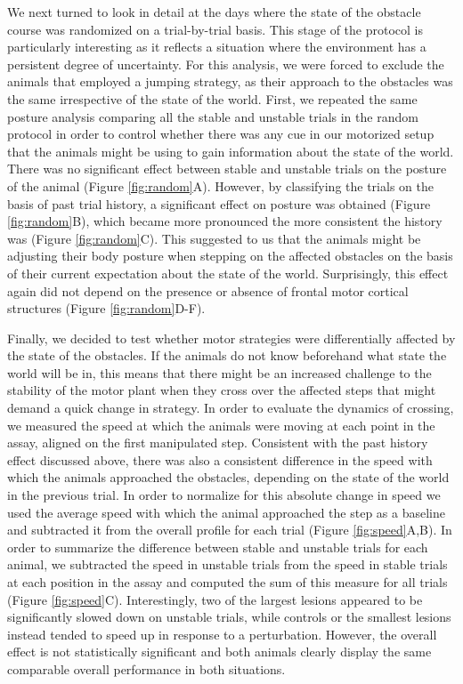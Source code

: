 We next turned to look in detail at the days where the state of the obstacle course was randomized on a trial-by-trial basis. This stage of the protocol is particularly interesting as it reflects a situation where the environment has a persistent degree of uncertainty. For this analysis, we were forced to exclude the animals that employed a jumping strategy, as their approach to the obstacles was the same irrespective of the state of the world. First, we repeated the same posture analysis comparing all the stable and unstable trials in the random protocol in order to control whether there was any cue in our motorized setup that the animals might be using to gain information about the state of the world. There was no significant effect between stable and unstable trials on the posture of the animal (Figure \ref{fig:random}A). However, by classifying the trials on the basis of past trial history, a significant effect on posture was obtained (Figure \ref{fig:random}B), which became more pronounced the more consistent the history was (Figure \ref{fig:random}C). This suggested to us that the animals might be adjusting their body posture when stepping on the affected obstacles on the basis of their current expectation about the state of the world. Surprisingly, this effect again did not depend on the presence or absence of frontal motor cortical structures (Figure \ref{fig:random}D-F).

Finally, we decided to test whether motor strategies were differentially affected by the state of the obstacles. If the animals do not know beforehand what state the world will be in, this means that there might be an increased challenge to the stability of the motor plant when they cross over the affected steps that might demand a quick change in strategy. In order to evaluate the dynamics of crossing, we measured the speed at which the animals were moving at each point in the assay, aligned on the first manipulated step. Consistent with the past history effect discussed above, there was also a consistent difference in the speed with which the animals approached the obstacles, depending on the state of the world in the previous trial. In order to normalize for this absolute change in speed we used the average speed with which the animal approached the step as a baseline and subtracted it from the overall profile for each trial (Figure \ref{fig:speed}A,B). In order to summarize the difference between stable and unstable trials for each animal, we subtracted the speed in unstable trials from the speed in stable trials at each position in the assay and computed the sum of this measure for all trials (Figure \ref{fig:speed}C). Interestingly, two of the largest lesions appeared to be significantly slowed down on unstable trials, while controls or the smallest lesions instead tended to speed up in response to a perturbation. However, the overall effect is not statistically significant and both animals clearly display the same comparable overall performance in both situations.

